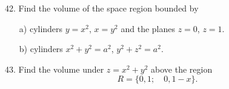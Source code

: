 \documentclass[11pt]{amsbook}
\begin{document}
    42. Find the volume of the space region bounded by
    \begin{enumerate}
        \item[a)] cylinders $y = x^2$, $x = y^2$ and the planes $z = 0$, $z = 1$.
        \item[b)] cylinders $x^2 + y^2 = a^2$, $y^2 + z^2 = a^2$.
    \end{enumerate}
    
    43. Find the volume under $z = x^2 + y^2$ above the region
    \[ R = \{0, 1;\quad  0, 1-x\}.\]
    
\end{document}
